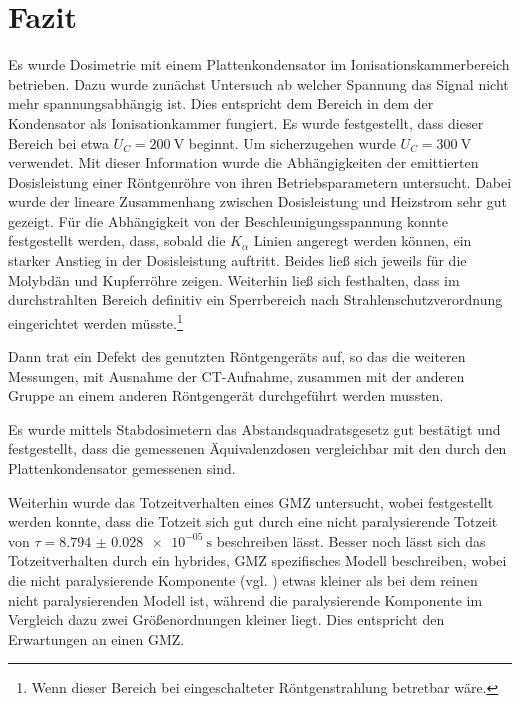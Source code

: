 \chapter{Fazit}




Es wurde Dosimetrie mit einem Plattenkondensator im Ionisationskammerbereich betrieben.
Dazu wurde zunächst Untersuch ab welcher Spannung das Signal nicht mehr spannungsabhängig ist. Dies entspricht dem Bereich in dem der Kondensator als Ionisationkammer fungiert. Es wurde festgestellt, dass dieser Bereich bei etwa $U_C = \SI{200}{\volt}$ beginnt. Um sicherzugehen wurde $U_C = \SI{300}{\volt}$ verwendet.
 Mit dieser Information wurde die Abhängigkeiten der emittierten Dosisleistung einer Röntgenröhre von ihren Betriebsparametern untersucht. Dabei wurde der lineare Zusammenhang zwischen Dosisleistung und Heizstrom sehr gut gezeigt. Für die Abhängigkeit von der Beschleunigungsspannung konnte festgestellt werden, dass, sobald die $K_\alpha$ Linien angeregt werden können, ein starker Anstieg in der Dosisleistung auftritt. Beides ließ sich jeweils für die Molybdän und Kupferröhre zeigen.
Weiterhin ließ sich festhalten, dass im durchstrahlten Bereich definitiv ein Sperrbereich nach Strahlenschutzverordnung eingerichtet werden müsste.\footnote{Wenn dieser Bereich bei eingeschalteter Röntgenstrahlung betretbar wäre.} 

Dann trat ein Defekt des genutzten Röntgengeräts auf, so das die weiteren Messungen, mit Ausnahme der CT-Aufnahme, zusammen mit der anderen Gruppe an einem anderen Röntgengerät durchgeführt werden mussten.

Es wurde mittels Stabdosimetern das Abstandsquadratsgesetz gut bestätigt und festgestellt, dass die gemessenen Äquivalenzdosen vergleichbar mit den durch den Plattenkondensator gemessenen sind.

Weiterhin wurde das Totzeitverhalten eines GMZ untersucht, wobei festgestellt werden konnte, dass die Totzeit sich gut durch eine nicht paralysierende Totzeit von $\tau = \SI{8.794(28)e-05}{\second}$ beschreiben lässt. Besser noch lässt sich das Totzeitverhalten durch ein hybrides, GMZ spezifisches Modell beschreiben, wobei die nicht paralysierende Komponente (vgl. ) etwas kleiner als bei dem reinen nicht paralysierenden Modell ist, während die paralysierende Komponente im Vergleich dazu zwei Größenordnungen kleiner liegt. Dies entspricht den Erwartungen an einen GMZ.

